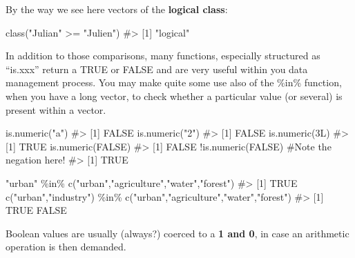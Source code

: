 \documentclass[
  letterpaper,
  DIV=11,
  numbers=noendperiod]{scrreprt}
\newenvironment{Shaded}{\begin{snugshade}}{\end{snugshade}}
\newcommand{\CommentTok}[1]{\textcolor[rgb]{0.37,0.37,0.37}{#1}}
\newcommand{\ConstantTok}[1]{\textcolor[rgb]{0.56,0.35,0.01}{#1}}
\newcommand{\DecValTok}[1]{\textcolor[rgb]{0.68,0.00,0.00}{#1}}
\newcommand{\FunctionTok}[1]{\textcolor[rgb]{0.28,0.35,0.67}{#1}}
\newcommand{\NormalTok}[1]{\textcolor[rgb]{0.00,0.23,0.31}{#1}}
\newcommand{\SpecialCharTok}[1]{\textcolor[rgb]{0.37,0.37,0.37}{#1}}
\newcommand{\StringTok}[1]{\textcolor[rgb]{0.13,0.47,0.30}{#1}}
\begin{document}
By the way we see here vectors of the \textbf{logical class}:

\begin{Shaded}
\begin{Highlighting}[]
\FunctionTok{class}\NormalTok{(}\StringTok{"Julian"} \SpecialCharTok{\textgreater{}=} \StringTok{"Julien"}\NormalTok{)}
\CommentTok{\#\textgreater{} [1] "logical"}
\end{Highlighting}
\end{Shaded}

In addition to those comparisons, many functions, especially structured
as ``is.xxx'' return a TRUE or FALSE and are very useful within you data
management process. You may make quite some use also of the \%in\%
function, when you have a long vector, to check whether a particular
value (or several) is present within a vector.

\begin{Shaded}
\begin{Highlighting}[]
\FunctionTok{is.numeric}\NormalTok{(}\StringTok{"a"}\NormalTok{)}
\CommentTok{\#\textgreater{} [1] FALSE}
\FunctionTok{is.numeric}\NormalTok{(}\StringTok{"2"}\NormalTok{)}
\CommentTok{\#\textgreater{} [1] FALSE}
\FunctionTok{is.numeric}\NormalTok{(}\DecValTok{3}\NormalTok{L)}
\CommentTok{\#\textgreater{} [1] TRUE}
\FunctionTok{is.numeric}\NormalTok{(}\ConstantTok{FALSE}\NormalTok{)}
\CommentTok{\#\textgreater{} [1] FALSE}
\SpecialCharTok{!}\FunctionTok{is.numeric}\NormalTok{(}\ConstantTok{FALSE}\NormalTok{) }\CommentTok{\#Note the negation here!}
\CommentTok{\#\textgreater{} [1] TRUE}

\StringTok{"urban"} \SpecialCharTok{\%in\%} \FunctionTok{c}\NormalTok{(}\StringTok{"urban"}\NormalTok{,}\StringTok{"agriculture"}\NormalTok{,}\StringTok{"water"}\NormalTok{,}\StringTok{"forest"}\NormalTok{)}
\CommentTok{\#\textgreater{} [1] TRUE}
\FunctionTok{c}\NormalTok{(}\StringTok{"urban"}\NormalTok{,}\StringTok{"industry"}\NormalTok{) }\SpecialCharTok{\%in\%} \FunctionTok{c}\NormalTok{(}\StringTok{"urban"}\NormalTok{,}\StringTok{"agriculture"}\NormalTok{,}\StringTok{"water"}\NormalTok{,}\StringTok{"forest"}\NormalTok{)}
\CommentTok{\#\textgreater{} [1]  TRUE FALSE}
\end{Highlighting}
\end{Shaded}

Boolean values are usually (always?) coerced to a \textbf{1 and 0}, in
case an arithmetic operation is then demanded.
\end{document}
